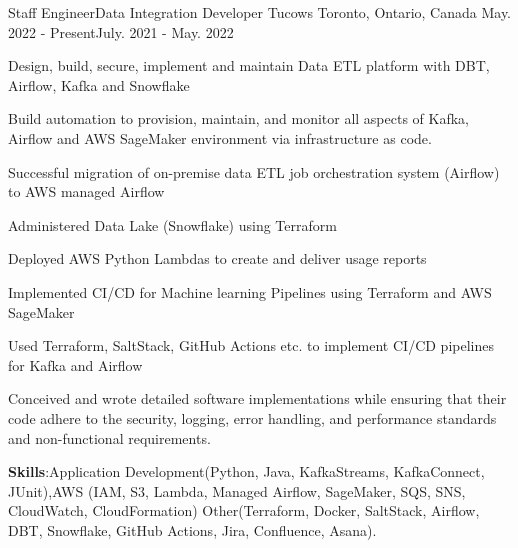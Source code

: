 

\begin{cventries}

  \cventry
  { Staff Engineer\newline Data Integration Developer\newline} %
  {Tucows} %
  {Toronto, Ontario, Canada} %
  {May. 2022 - Present\newline July. 2021 - May. 2022} %
    {
      \begin{cvitems} %
        \item {Design, build, secure, implement and maintain Data ETL platform with DBT, Airflow, Kafka and Snowflake}
        \item {Build automation to provision, maintain, and monitor all aspects of Kafka, Airflow and AWS SageMaker  environment via infrastructure as code.}
        \item {Successful  migration of on-premise data ETL job orchestration system (Airflow) to AWS managed Airflow}
        \item {Administered Data Lake (Snowflake) using Terraform}
        \item {Deployed AWS Python Lambdas to create and deliver usage reports }
        \item {Implemented CI/CD for Machine learning Pipelines using Terraform and AWS SageMaker}
        \item { Used Terraform, SaltStack, GitHub Actions etc. to implement CI/CD pipelines for Kafka and Airflow}
        \item {Conceived and wrote detailed software implementations while ensuring that their code adhere to the security, logging, error handling, and performance standards and non-functional requirements.}
        \vspace{1mm} %
        \item {\textbf{Skills}:Application Development(Python, Java, KafkaStreams, KafkaConnect, JUnit),AWS (IAM, S3, Lambda, Managed Airflow, SageMaker, SQS, SNS, CloudWatch, CloudFormation) Other(Terraform, Docker, SaltStack, Airflow, DBT, Snowflake, GitHub Actions, Jira, Confluence, Asana).}

\end{cvitems}}
\end{cventries}
